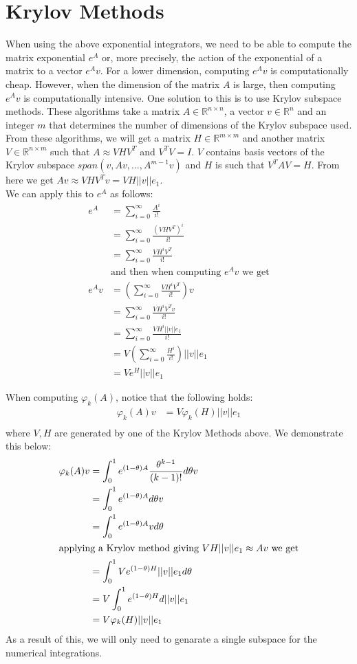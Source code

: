 \section{Krylov Methods}
When using the above exponential integrators, we need to be able to compute the matrix exponential $e^{A}$ or, more precisely, the action of the exponential of a matrix to a vector $e^{A}v$.
For a lower dimension, computing $e^{A}v$ is computationally cheap.
However, when the dimension of the matrix $A$ is large, then computing $e^{A}v$ is computationally intensive.
One solution to this is to use Krylov subspace methods.
These algorithms take a matrix $A\in \mathbb{R}^{n\times n}$, a vector $v \in \mathbb{R}^n$ and an integer $m$ that determines the number of dimensions of the Krylov subspace used.
From these algorithms, we will get a matrix $H \in \mathbb{R}^{m\times m}$ and another matrix $V \in \mathbb{R}^{n\times m}$ such that $A \approx VHV^T$ and $V^TV = I$.
$V$ contains basis vectors of the Krylov subspace $span(v, Av, ..., A^{m-1}v)$ and $H$ is such that $V^TAV = H$.
From here we get $Av \approx VHV^Tv = VH||v||e_1$.\\
We can apply this to $e^A$ as follows:
\begin{align*}
e^A &= \sum^{\infty}_{i=0}\frac{A^i}{i!}\\
&= \sum^{\infty}_{i=0}\frac{(VHV^T)^i}{i!} \\
&= \sum^{\infty}_{i=0}\frac{VH^iV^T}{i!} \\
&\text {and then when computing $e^Av$ we get}\\
e^Av &= (\sum^{\infty}_{i=0}\frac{VH^iV^T}{i!})v \\
&= \sum^{\infty}_{i=0}\frac{VH^iV^Tv}{i!} \\
&= \sum^{\infty}_{i=0}\frac{VH^i||v||e_1}{i!} \\
&= V(\sum^{\infty}_{i=0}\frac{H^i}{i!})||v||e_1 \\
&= Ve^H||v||e_1
\end{align*}

When computing $\varphi_k(A)$, notice that the following holds:
\begin{align*}
    \varphi_k(A)v &= V\varphi_k(H)||v||e_1\\
\end{align*}
where $V,H$ are generated by one of the Krylov Methods above. 
We demonstrate this below:
\begin{align*}
    \varphi_k(A)v &= \int^1_0e^{(1-\theta)A}\frac{\theta^{k-1}}{(k-1)!}d\theta v\\
    &= \int^1_0e^{(1-\theta) A}d\theta v\\
    &= \int^1_0e^{(1-\theta) A}vd\theta\\
\intertext{applying a Krylov method giving $VH||v||e_1 \approx Av$ we get}
    &= \int^1_0Ve^{(1-\theta) H}||v||e_1d\theta\\
    &= V\int^1_0e^{(1-\theta) H}d||v||e_1\\
    &= V\varphi_k(H)||v||e_1
\end{align*}
As a result of this, we will only need to genarate a single subspace for the numerical integrations.

